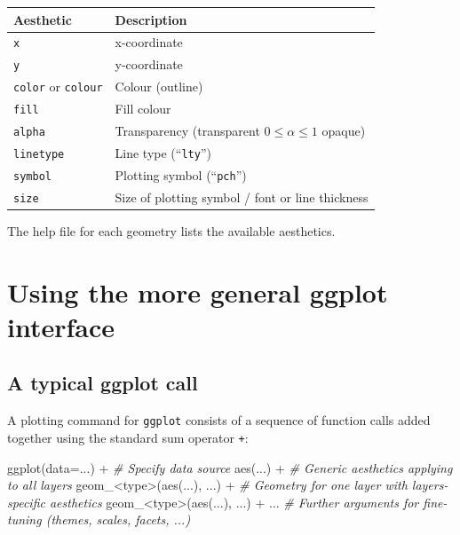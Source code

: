 \documentclass[
]{book}
\newenvironment{Shaded}{\begin{snugshade}}{\end{snugshade}}
\newcommand{\AttributeTok}[1]{\textcolor[rgb]{0.77,0.63,0.00}{#1}}
\newcommand{\CommentTok}[1]{\textcolor[rgb]{0.56,0.35,0.01}{\textit{#1}}}
\newcommand{\FunctionTok}[1]{\textcolor[rgb]{0.00,0.00,0.00}{#1}}
\newcommand{\NormalTok}[1]{#1}
\newcommand{\SpecialCharTok}[1]{\textcolor[rgb]{0.00,0.00,0.00}{#1}}
\begin{document}
\begin{longtable}[]{@{}ll@{}}
\toprule()
Aesthetic & Description \\
\midrule()
\endhead
\texttt{x} & x-coordinate \\
\texttt{y} & y-coordinate \\
\texttt{color} or \texttt{colour} & Colour (outline) \\
\texttt{fill} & Fill colour \\
\texttt{alpha} & Transparency (transparent \(0\leq \alpha\leq 1\) opaque) \\
\texttt{linetype} & Line type (``\texttt{lty}'') \\
\texttt{symbol} & Plotting symbol (``\texttt{pch}'') \\
\texttt{size} & Size of plotting symbol / font or line thickness \\
\bottomrule()
\end{longtable}

The help file for each geometry lists the available aesthetics.

\hypertarget{using-the-more-general-ggplot-interface}{%
\section{Using the more general ggplot interface}\label{using-the-more-general-ggplot-interface}}

\hypertarget{a-typical-ggplot-call}{%
\subsection{A typical ggplot call}\label{a-typical-ggplot-call}}

A plotting command for \texttt{ggplot} consists of a sequence of function calls added together using the standard sum operator \texttt{+}:

\begin{Shaded}
\begin{Highlighting}[]
\FunctionTok{ggplot}\NormalTok{(}\AttributeTok{data=}\NormalTok{...) }\SpecialCharTok{+}                \CommentTok{\# Specify data source}
    \FunctionTok{aes}\NormalTok{(...) }\SpecialCharTok{+}                    \CommentTok{\# Generic aesthetics applying to all layers}
\NormalTok{    geom\_}\SpecialCharTok{\textless{}}\NormalTok{type}\SpecialCharTok{\textgreater{}}\NormalTok{(}\FunctionTok{aes}\NormalTok{(...), ...)  }\SpecialCharTok{+} \CommentTok{\# Geometry for one layer with layers{-}specific aesthetics}
\NormalTok{    geom\_}\SpecialCharTok{\textless{}}\NormalTok{type}\SpecialCharTok{\textgreater{}}\NormalTok{(}\FunctionTok{aes}\NormalTok{(...), ...)  }\SpecialCharTok{+}
\NormalTok{    ...                           }\CommentTok{\# Further arguments for fine{-}tuning (themes, scales, facets, ...)}
\end{Highlighting}
\end{Shaded}
\end{document}
